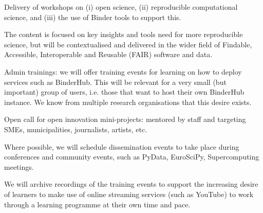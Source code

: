 \begin{task}[
  title=Training Workshops for more reproducible science,
  id=workshops,
  lead=UIO,
  PM=10,
  wphases={12-36!.416},
  partners={SRL,MP,IFR,UIO}
]
\begin{compactitem}

   \item Delivery of workshops on (i) open science, (ii) reproducible computational
     science, and (iii) the use of Binder tools to support this.

     The content is focused on key insights and tools need for more reproducible
     science, but will be contextualised and delivered in the wider field of
     Findable, Accessible, Interoperable and Reusable (FAIR) software and data.
     

   \item \TheProject Admin trainings: we will offer training events for learning on how to
     deploy \TheProject services such as BinderHub. This will be relevant for a
     very small (but important) group of users, i.e. those that want to host
     their own BinderHub instance. We know from multiple research organisations
     that this desire exists.

   \item Open call for open innovation mini-projects: mentored by \TheProject
     staff and targeting SMEs, municipalities, journalists, artists, etc.

   \item Where possible, we will schedule dissemination events to take place
     during conferences and community events, such as PyData, EuroSciPy,
     Supercomputing meetings.

   \item We will archive recordings of the training events to support the
     increasing desire of learners to make use of online streaming services
     (such as YouTube) to work through a learning programme at their own time
     and pace.


\end{compactitem}
\end{task}
